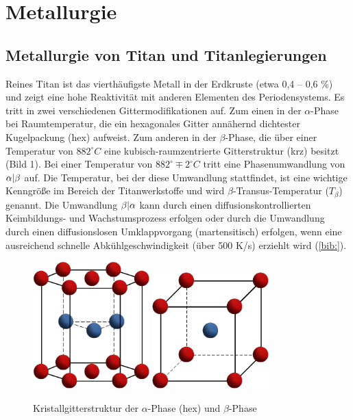 \chapter{Metallurgie}	


\section{Metallurgie von Titan und Titanlegierungen}
Reines Titan ist das vierthäufigste Metall in der Erdkruste (etwa 0,4 -- 0,6 \%) und zeigt eine hohe Reaktivität mit anderen Elementen des Periodensystems. Es tritt in zwei verschiedenen Gittermodifikationen auf. Zum einen in der $\alpha$-Phase bei Raumtemperatur, die ein hexagonales Gitter annähernd dichtester Kugelpackung (hex) aufweist. Zum anderen in der $\beta$-Phase, die über einer Temperatur von $882 ^\circ C$ eine kubisch-raumzentrierte Gitterstruktur (krz) besitzt (Bild 1). Bei einer Temperatur von $882^\circ \mp 2 ^\circ C$ tritt eine Phasenumwandlung von $\alpha \arrowvert \beta$ auf. Die Temperatur, bei der diese Umwandlung stattfindet, ist eine wichtige Kenngröße im Bereich der Titanwerkstoffe und wird $\beta$-Transus-Temperatur ($T_{\beta}$) genannt.
Die Umwandlung $\beta \arrowvert \alpha$ kann durch einen diffusionskontrollierten Keimbildungs- und Wachstumsprozess erfolgen oder durch die Umwandlung durch einen diffusionslosen Umklappvorgang (martensitisch) erfolgen, wenn eine ausreichend schnelle Abkühlgeschwindigkeit (über 500 K/s) erziehlt wird (\ref{bib:}).

\begin{figure}
	\centering
	\subfloat{}
	\includegraphics[width=0.4\textwidth]{Bilder/hcp}
	\hspace{2ex}
	\subfloat{}
	\includegraphics[width=0.4\textwidth]{Bilder/krz}
	\caption{Kristallgitterstruktur der $\alpha$-Phase (hex) und $\beta$-Phase}
	\label{fig:Kristallgitter}
\end{figure}


